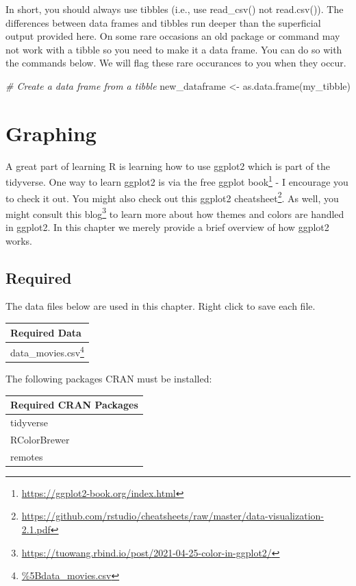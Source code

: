 \documentclass[
]{krantz}
\makeatletter
\newenvironment{Shaded}{\begin{snugshade}}{\end{snugshade}}
\newcommand{\CommentTok}[1]{\textcolor[rgb]{0.37,0.37,0.37}{\textit{#1}}}
\newcommand{\FunctionTok}[1]{\textcolor[rgb]{0,0,0}{#1}}
\newcommand{\NormalTok}[1]{#1}
\newcommand{\OtherTok}[1]{\textcolor[rgb]{0.37,0.37,0.37}{#1}}
\renewcommand{\href}[2]{#2\footnote{\url{#1}}}
\newenvironment{kframe}{%
\medskip{}
\setlength{\fboxsep}{.8em}
 \def\at@end@of@kframe{}%
 \ifinner\ifhmode%
  \def\at@end@of@kframe{\end{minipage}}%
  \begin{minipage}{\columnwidth}%
 \fi\fi%
 \def\FrameCommand##1{\hskip\@totalleftmargin \hskip-\fboxsep
 \colorbox{shadecolor}{##1}\hskip-\fboxsep
     \hskip-\linewidth \hskip-\@totalleftmargin \hskip\columnwidth}%
 \MakeFramed {\advance\hsize-\width
   \@totalleftmargin\z@ \linewidth\hsize
   \@setminipage}}%
 {\par\unskip\endMakeFramed%
 \at@end@of@kframe}
\renewenvironment{Shaded}{\begin{kframe}}{\end{kframe}}
\makeatother
\begin{document}
In short, you should always use tibbles (i.e., use read\_csv() not read.csv()). The differences between data frames and tibbles run deeper than the superficial output provided here. On some rare occasions an old package or command may not work with a tibble so you need to make it a data frame. You can do so with the commands below. We will flag these rare occurances to you when they occur.

\begin{Shaded}
\begin{Highlighting}[]
\CommentTok{\# Create a data frame from a tibble}
\NormalTok{new\_dataframe }\OtherTok{\textless{}{-}} \FunctionTok{as.data.frame}\NormalTok{(my\_tibble)}
\end{Highlighting}
\end{Shaded}

\hypertarget{graphing}{%
\chapter{Graphing}\label{graphing}}

A great part of learning R is learning how to use ggplot2 which is part of the tidyverse. One way to learn ggplot2 is via the \href{https://ggplot2-book.org/index.html}{free ggplot book} - I encourage you to check it out. You might also check out this ggplot2 \href{https://github.com/rstudio/cheatsheets/raw/master/data-visualization-2.1.pdf}{cheatsheet}. As well, you might consult this \href{https://tuowang.rbind.io/post/2021-04-25-color-in-ggplot2/}{blog} to learn more about how themes and colors are handled in ggplot2. In this chapter we merely provide a brief overview of how ggplot2 works.

\hypertarget{required-1}{%
\section{Required}\label{required-1}}

The data files below are used in this chapter. Right click to save each file.

\begin{longtable}[]{@{}l@{}}
\toprule
Required Data \\
\midrule
\endhead
\href{\%5Bdata_movies.csv}{data\_movies.csv} \\
\bottomrule
\end{longtable}

The following packages CRAN must be installed:

\begin{longtable}[]{@{}l@{}}
\toprule
Required CRAN Packages \\
\midrule
\endhead
tidyverse \\
RColorBrewer \\
remotes \\
\bottomrule
\end{longtable}
\end{document}

